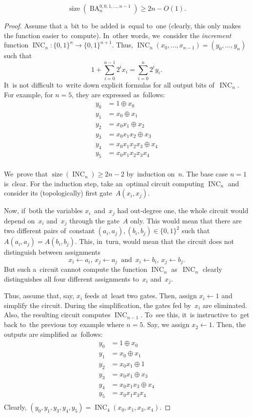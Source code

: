 \documentclass[sigconf, review, anonymous]{acmart}
\DeclareMathOperator{\BA}{BA}
\DeclareMathOperator{\INC}{INC}
\DeclareMathOperator{\size}{size}
\begin{document}
\begin{theorem}
	\label{theorem:lowerbound}
	\[\size(\BA_n^{0,0,1,\dotsc,n-1}) \ge 2n-O(1).\]
\end{theorem}
\begin{proof}
	Assume that a~bit to~be added is~equal to~one (clearly, this only makes the function easier to~compute). In~other words,
	we~consider the \emph{increment} function $\INC_n \colon \{0,1\}^n \to \{0,1\}^{n+1}$. Thus, $\INC_n(x_0, \dotsc, x_{n-1})=(y_0, \dotsc, y_n)$ such that
	\[1+\sum_{i=0}^{n-1}2^ix_i=\sum_{i=0}^n2^iy_i.\]
	It~is not difficult to~write down explicit formulas for all output bits of~$\INC_n$. For example, for $n=5$, they are expressed as~follows:
	\begin{align*}
		y_0 &= 1 \oplus x_0\\
		y_1 &= x_0 \oplus x_1\\
		y_2 &= x_0x_1 \oplus x_2\\
		y_3 &= x_0x_1x_2 \oplus x_3\\
		y_4 &= x_0x_1x_2x_3 \oplus x_4\\
		y_5 &= x_0x_1x_2x_3x_4\\
	\end{align*}
	
	We~prove that $\size(\INC_n) \ge 2n-2$ by~induction on~$n$.
	The base case $n=1$ is~clear. For the induction step, take an~optimal circuit computing $\INC_n$ and consider its (topologically) first gate~$A(x_i, x_j)$.
	
	Now, if~both the variables $x_i$~and~$x_j$ had out-degree one, the whole circuit would depend on~$x_i$ and~$x_j$ through the gate~$A$ only. This would mean that there are two different pairs of~constant $(a_i, a_j), (b_i, b_j) \in \{0,1\}^2$ such that $A(a_i, a_j)=A(b_i, b_j)$. This, in~turn, would mean that the circuit does not distinguish between assignments
	\[x_i \gets a_i,\, x_j \gets a_j \,\text{ and }\, x_i \gets b_i,\, x_j \gets b_j.\]
	But such a~circuit cannot compute the function $\INC_n$ as~$\INC_n$ clearly distinguishes all four different assignments to~$x_i$ and~$x_j$.
	
	Thus, assume that, say, $x_i$ feeds at~least two gates. Then, assign $x_i \gets 1$ and simplify the circuit. During the simplification, the gates fed by~$x_i$ are eliminated. Also, the resulting circuit computes $\INC_{n-1}$. To~see this,
	it~is instructive 
	to~get back to~the previous toy example where $n=5$. Say, we assign $x_2 \gets 1$. Then, the outputs are simplified as~follows:
	\begin{align*}
		y_0 &= 1 \oplus x_0\\
		y_1 &= x_0 \oplus x_1\\
		y_2 &= x_0x_1 \oplus 1\\
		y_3 &= x_0x_1 \oplus x_3\\
		y_4 &= x_0x_1x_3 \oplus x_4\\
		y_5 &= x_0x_1x_3x_4\\
	\end{align*}
	Clearly, $(y_0,y_1,y_3,y_4,y_5)=\INC_4(x_0, x_1, x_3, x_4)$.
	

\end{proof}
\end{document}
